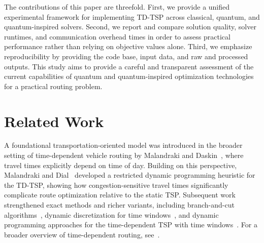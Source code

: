 \documentclass[conference]{IEEEtran}
\begin{document}
The contributions of this paper are threefold. First, we provide a unified experimental framework for implementing TD-TSP across classical, quantum, and quantum-inspired solvers. Second, we report and compare solution quality, solver runtimes, and communication overhead times in order to assess practical performance rather than relying on objective values alone. Third, we emphasize reproducibility by providing the code base, input data, and raw and processed outputs. This study aims to provide a careful and transparent assessment of the current capabilities of quantum and quantum-inspired optimization technologies for a practical routing problem.

\section{Related Work}

A foundational transportation-oriented model was introduced in the broader setting of time-dependent vehicle routing by Malandraki and Daskin~\cite{MalandrakiDaskin1992}, where travel times explicitly depend on time of day. Building on this perspective, Malandraki and Dial~\cite{MalandrakiDial1996} developed a restricted dynamic programming heuristic for the TD-TSP, showing how congestion-sensitive travel times significantly complicate route optimization relative to the static TSP. Subsequent work strengthened exact methods and richer variants, including branch-and-cut algorithms~\cite{CordeauGhianiGuerriero2014}, dynamic discretization for time windows~\cite{VuHewittBolandSavelsbergh2020}, and dynamic programming approaches for the time-dependent TSP with time windows~\cite{LeraRomeroMirandaBrontSoulignac2022}. For a broader overview of time-dependent routing, see~\cite{GendreauGhianiGuerriero2015}.
\end{document}
